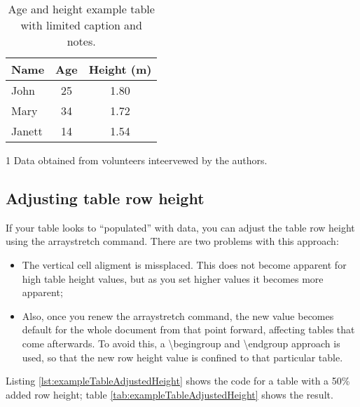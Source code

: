 \begin{table}[h]
	\begin{center}
		\begin{threeparttable}
			\caption{Age and height example table with limited caption and notes.}
			\label{tab:exampleTableWithNotes}
			\begin{tabular}{l c c}
				\hline
				\textbf{Name}\tnote{1} & \textbf{Age} & \textbf{Height} (m) \\
				\hline
				John & 25 & 1.80\\
				Mary & 34 & 1.72\\
				Janett & 14 & 1.54\\
				\hline
			\end{tabular}
			\begin{tablenotes}[flushleft]
				\item[1] Data obtained from volunteers inteervewed by the authors.
			\end{tablenotes}
		\end{threeparttable}
	\end{center}
\end{table}

		\subsection{Adjusting table row height}

	If your table looks to ``populated'' with data, you can adjust the table row height using the {\ttfamily arraystretch} command. There are two problems with this approach:

\begin{itemize}
	\item The vertical cell aligment is missplaced. This does not become apparent for high table height values, but as you set higher values it becomes more apparent;
	\item Also, once you renew the {\ttfamily arraystretch} command, the new value becomes default for the whole document from that point forward, affecting tables that come afterwards. To avoid this, a {\ttfamily \textbackslash begingroup} and {\ttfamily \textbackslash endgroup} approach is used, so that the new row height value is confined to that particular table.
\end{itemize}

	Listing \ref{lst:exampleTableAdjustedHeight} shows the code for a table with a 50\% added row height; table \ref{tab:exampleTableAdjustedHeight} shows the result.

